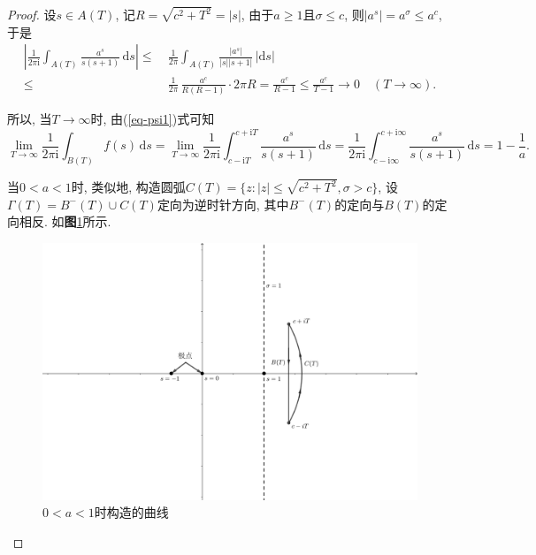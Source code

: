\documentclass[12pt, a4paper, oneside]{ctexart}
\numberwithin{equation}{section}  %
\let\leq=\leqslant %
\let\geq=\geqslant %
\def\d{\mathrm{d}}          %
\def\i{\mathrm{i}}          %
\begin{document}
\begin{proof}
    设$s\in A(T)$, 记$R = \sqrt{c^2+T^2} = |s|$, 由于$a\geq 1$且$\sigma \leq c$, 则$|a^s| = a^{\sigma}\leq a^c$, 于是
    \begin{equation}\label{eq-psi0}
        \begin{aligned}
            \left|\frac{1}{2\pi\i}\int_{A(T)}\frac{a^s}{s(s+1)}\,\d s\right|\leq&\ \frac{1}{2\pi}\int_{A(T)}\frac{|a^s|}{|s||s+1|}\,|\d s|\\
            \leq&\ \frac{1}{2\pi}\,\frac{a^c}{R(R-1)}\cdot 2 \pi R = \frac{a^c}{R-1}\leq \frac{a^c}{T-1}\to 0\quad(T\to \infty).
        \end{aligned}
    \end{equation}

    所以, 当$T\to\infty$时, 由(\ref{eq-psi1})式可知
    \begin{equation*}
        \lim_{T\to\infty}\frac{1}{2\pi\i}\int_{B(T)}f(s)\,\d s=\lim_{T\to \infty}\frac{1}{2\pi\i}\int_{c-\i T}^{c+\i T}\frac{a^s}{s(s+1)}\,\d s=\frac{1}{2\pi \i}\int_{c-\i\infty}^{c+\i\infty}\frac{a^s}{s(s+1)}\,\d s = 1-\frac{1}{a}.
    \end{equation*}

    当$0 < a < 1$时, 类似地, 构造圆弧$C(T) = \{z:|z|\leq \sqrt{c^2+T^2},\sigma > c\}$, 设$\Gamma(T) = B^-(T)\cup C(T)$定向为逆时针方向, 其中$B^-(T)$的定向与$B(T)$的定向相反. 如\textbf{图}\ref{figure-psi2}所示.
    \begin{figure}[htbp] %
        \centering
        \includegraphics[scale=0.5]{引理计算psi1_2.pdf}
        \caption{$0 < a < 1$时构造的曲线}
        \label{figure-psi2}
    \end{figure}
    

\end{proof}
\end{document}
